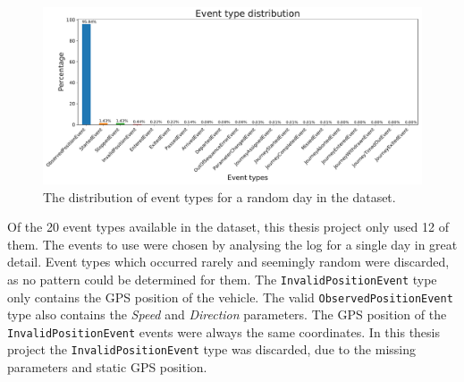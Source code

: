\begin{figure}[ht!]
    \centering
    \includegraphics[width=\textwidth]{figures/types_barplot}
    \caption{The distribution of event types for a random day in the dataset.}
    \label{fig:types-barplot}
\end{figure}

Of the 20 event types available in the dataset, this thesis project only used 12 of them.
The events to use were chosen by analysing the log for a single day in great detail.
Event types which occurred rarely and seemingly random were discarded, as no pattern could be determined for them.
The \texttt{InvalidPositionEvent} type only contains the GPS position of the vehicle.
The valid \texttt{ObservedPositionEvent} type also contains the \textit{Speed} and \textit{Direction} parameters.
The GPS position of the \texttt{InvalidPositionEvent} events were always the same coordinates.
In this thesis project the \texttt{InvalidPositionEvent} type was discarded, due to the missing parameters and static GPS position.

